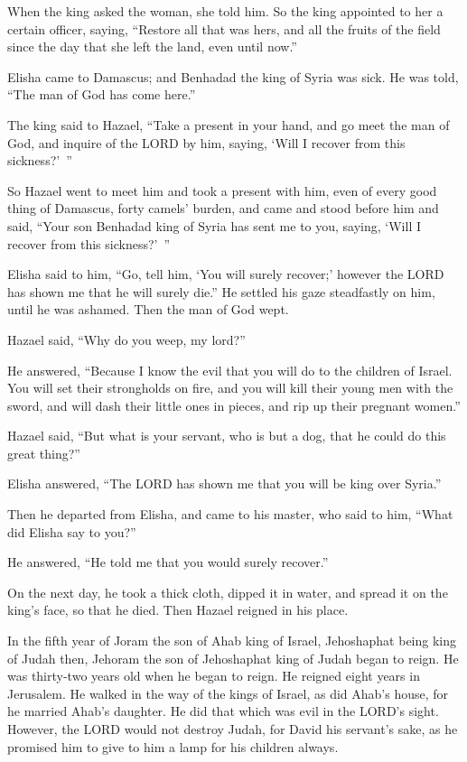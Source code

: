 \myverse{}When the king asked the woman, she told him. So the king appointed
to her a certain officer, saying, “Restore all that was hers, and all the fruits of the field since the
day that she left the land, even until now.”

\myverse{}Elisha came to Damascus; and Benhadad the king of Syria was sick.
He was told, “The man of God has come here.”

\myverse{}The king said to Hazael, “Take a present in your hand, and go meet
the man of God, and inquire of the LORD by him, saying, ‘Will I recover from this sickness?’ ”

\myverse{}So Hazael went to meet him and took a present with him, even of
every good thing of Damascus, forty camels’ burden, and came and stood before him and said, “Your son
Benhadad king of Syria has sent me to you, saying, ‘Will I recover from this sickness?’ ”

\myverse{}Elisha said to him, “Go, tell him, ‘You will surely recover;’
however the LORD has shown me that he will surely die.”
\myverse{}He settled his gaze steadfastly on him, until he was ashamed. Then the man
of God wept.

\myverse{}Hazael said, “Why do you weep, my lord?”

He answered, “Because I know the evil that you will do to the children of Israel. You will
set their strongholds on fire, and you will kill their young men with the sword, and will dash their little
ones in pieces, and rip up their pregnant women.”

\myverse{}Hazael said, “But what is your servant, who is but a dog, that
he could do this great thing?”

Elisha answered, “The LORD has shown me that you will be king over Syria.”

\myverse{}Then he departed from Elisha, and came to his master, who said
to him, “What did Elisha say to you?”

He answered, “He told me that you would surely recover.”

\myverse{}On the next day, he took a thick cloth, dipped it in water, and
spread it on the king’s face, so that he died. Then Hazael reigned in his place.

\myverse{}In the fifth year of Joram the son of Ahab king of Israel, Jehoshaphat
being king of Judah then, Jehoram the son of Jehoshaphat king of Judah began to reign.
\myverse{}He was thirty-two years old when he began to reign. He reigned eight years
in Jerusalem.
\myverse{}He walked in the way of the kings of Israel, as did Ahab’s house, for he married
Ahab’s daughter. He did that which was evil in the LORD’s sight.
\myverse{}However, the LORD would not destroy Judah, for David his servant’s sake, as
he promised him to give to him a lamp for his children always.

